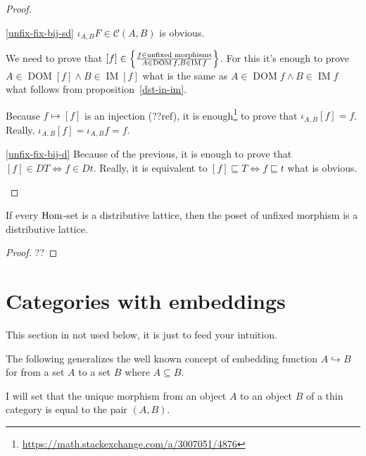 \begin{proof}
~
\begin{widedisorder}
\item[\ref{unfix-fix-bij-sd}]
$\iota_{A,B}F\in\mathcal{C}(A,B)$ is obvious.

We need to prove that
$[f]\in\left\{ \frac{f\in\text{unfixed morphisms}}{A\in\operatorname{DOM}f,B\in\operatorname{IM}f}\right\}$.
For this it's enough to prove
$A\in\operatorname{DOM}[f]\land B\in\operatorname{IM}[f]$
what is the same as
$A\in\operatorname{DOM}f\land B\in\operatorname{IM}f$
what follows from proposition~\ref{dst-in-im}.

Because $f\mapsto[f]$ is an injection (??ref), it is
enough\footnote{\url{https://math.stackexchange.com/a/3007051/4876}}
to prove that 
$\iota_{A,B}[f]=f$. Really, $\iota_{A,B}[f]=\iota_{A,B}f=f$.

\item[\ref{unfix-fix-bij-d}]
Because of the previous, it is enough to prove that
$[f]\in DT\Leftrightarrow f\in Dt$. Really, it is equivalent
to $[f]\sqsubseteq T\Leftrightarrow f\sqsubseteq t$
what is obvious.
\end{widedisorder}
\end{proof}

\begin{prop}
If every $\operatorname{Hom}$-set is a distributive lattice, then
the poset of unfixed morphism is a distributive lattice.
\end{prop}

\begin{proof}
??
\end{proof}

\section{Categories with embeddings}

\begin{note}
This section in not used below, it is just to feed your intuition.
\end{note}

The following generalizes the well known concept of embedding function $A
\hookrightarrow B$ for from a set $A$ to a set $B$ where $A \subseteq B$.

I will set that the unique morphism from an object $A$ to an object $B$ of a
thin category is equal to the pair $(A , B)$.

